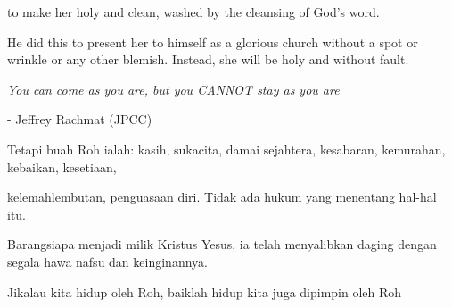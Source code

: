 \documentclass{beamer}
\begin{document}
\begin{frame}{}
	\Large
	\begin{tcolorbox}[colback=green!5,colframe=green!40!black,title=Efesus 5:26 (NLT)]
		to make her holy and clean, washed by the cleansing of God's word.
	\end{tcolorbox}
\end{frame}

\begin{frame}{}
	\Large
	\begin{tcolorbox}[colback=green!5,colframe=green!40!black,title=Efesus 5:27 (NLT)]
		He did this to present her to himself as a glorious church without a spot or wrinkle or any other blemish. Instead, she will be holy and without fault.
	\end{tcolorbox}
\end{frame}

\begin{frame}{}
	\LARGE
	\centering
	\textit{You can come as you are, but you CANNOT stay as you are}
	
	\bigskip
	\normalsize
	- Jeffrey Rachmat (JPCC)
\end{frame}


\begin{frame}{}
	\Large
	\begin{tcolorbox}[colback=green!5,colframe=green!40!black,title=Galatia 5:22 (TB)]
		Tetapi buah Roh ialah: kasih, sukacita, damai sejahtera, kesabaran, kemurahan, kebaikan, kesetiaan,
	\end{tcolorbox}
\end{frame}

\begin{frame}{}
	\Large
	\begin{tcolorbox}[colback=green!5,colframe=green!40!black,title=Galatia 5:23 (TB)]
		kelemahlembutan, penguasaan diri. Tidak ada hukum yang menentang hal-hal itu.
	\end{tcolorbox}
\end{frame}

\begin{frame}{}
	\Large
	\begin{tcolorbox}[colback=green!5,colframe=green!40!black,title=Galatia 5:24 (TB)]
		Barangsiapa menjadi milik Kristus Yesus, ia telah menyalibkan daging dengan segala hawa nafsu dan keinginannya.
	\end{tcolorbox}
\end{frame}

\begin{frame}{}
	\Large
	\begin{tcolorbox}[colback=green!5,colframe=green!40!black,title=Galatia 5:25 (TB)]
		Jikalau kita hidup oleh Roh, baiklah hidup kita juga dipimpin oleh Roh
	\end{tcolorbox}
\end{frame}
\end{document}
